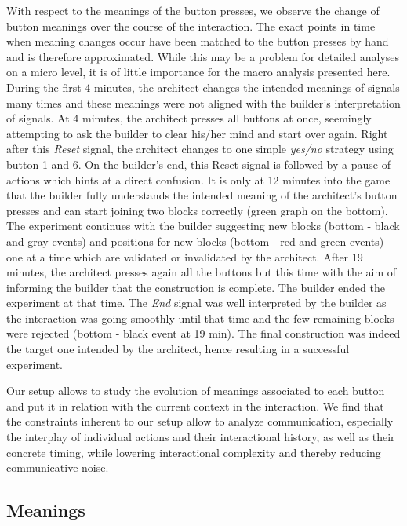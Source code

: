 With respect to the meanings of the button presses, we observe the change of button meanings over the course of the interaction. The exact points in time when meaning changes occur have been matched to the button presses by hand and is therefore approximated. While this may be a problem for detailed analyses on a micro level, it is of little importance for the macro analysis presented here. During the first 4 minutes, the architect changes the intended meanings of signals many times and these meanings were not aligned with the builder's interpretation of signals. At 4 minutes, the architect presses all buttons at once, seemingly attempting to ask the builder to clear his/her mind and start over again. Right after this \emph{Reset} signal, the architect changes to one simple \emph{yes/no} strategy using button 1 and 6. On the builder's end, this Reset signal is followed by a pause of actions which hints at a direct confusion. It is only at 12 minutes into the game that the builder fully understands the intended meaning of the architect's button presses and can start joining two blocks correctly (green graph on the bottom). The experiment continues with the builder suggesting new blocks (bottom - black and gray events) and positions for new blocks (bottom - red and green events) one at a time which are validated or invalidated by the architect. After 19 minutes, the architect presses again all the buttons but this time with the aim of informing the builder that the construction is complete. The builder ended the experiment at that time. The \emph{End} signal was well interpreted by the builder as the interaction was going smoothly until that time and the few remaining blocks were rejected (bottom - black event at 19 min). The final construction was indeed the target one intended by the architect, hence resulting in a successful experiment.

Our setup allows to study the evolution of meanings associated to each button and put it in relation with the current context in the interaction.
We find that the constraints inherent to our setup allow to analyze communication, especially the interplay of individual actions and their interactional history, as well as their concrete timing, while lowering interactional complexity and thereby reducing communicative noise.

\subsection{Meanings} 

